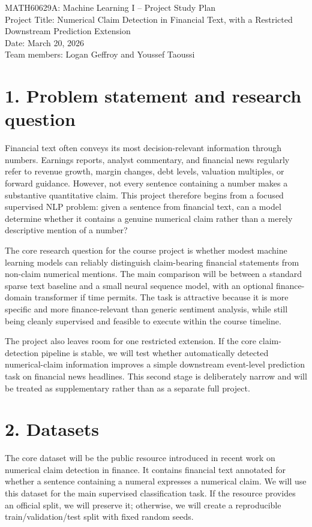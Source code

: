 \documentclass[11pt]{article}
\begin{document}
\begin{center}
{\Large MATH60629A: Machine Learning I -- Project Study Plan} \\
\vspace{0.5em}
{\large Project Title: Numerical Claim Detection in Financial Text, with a Restricted Downstream Prediction Extension} \\
\vspace{0.5em}
Date: March 20, 2026 \\
Team members: Logan Geffroy and Youssef Taoussi
\end{center}

\section*{1. Problem statement and research question}
Financial text often conveys its most decision-relevant information through numbers. Earnings reports, analyst commentary, and financial news regularly refer to revenue growth, margin changes, debt levels, valuation multiples, or forward guidance. However, not every sentence containing a number makes a substantive quantitative claim. This project therefore begins from a focused supervised NLP problem: given a sentence from financial text, can a model determine whether it contains a genuine numerical claim rather than a merely descriptive mention of a number?

The core research question for the course project is whether modest machine learning models can reliably distinguish claim-bearing financial statements from non-claim numerical mentions. The main comparison will be between a standard sparse text baseline and a small neural sequence model, with an optional finance-domain transformer if time permits. The task is attractive because it is more specific and more finance-relevant than generic sentiment analysis, while still being cleanly supervised and feasible to execute within the course timeline.

The project also leaves room for one restricted extension. If the core claim-detection pipeline is stable, we will test whether automatically detected numerical-claim information improves a simple downstream event-level prediction task on financial news headlines. This second stage is deliberately narrow and will be treated as supplementary rather than as a separate full project.

\section*{2. Datasets}
The core dataset will be the public resource introduced in recent work on numerical claim detection in finance. It contains financial text annotated for whether a sentence containing a numeral expresses a numerical claim. We will use this dataset for the main supervised classification task. If the resource provides an official split, we will preserve it; otherwise, we will create a reproducible train/validation/test split with fixed random seeds.
\end{document}
